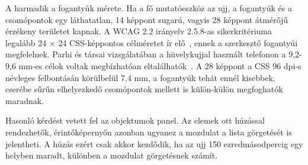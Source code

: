 A harmadik a fogantyúk mérete. Ha a fő mutatóeszköz az ujj, a fogantyúk és a csomópontok egy láthatatlan, 14 képpont sugarú, vagyis 28 képpont átmérőjű érzékeny területet kapnak. A WCAG 2.2 irányelv 2.5.8-as sikerkritériuma legalább 24 × 24 CSS-képpontos célméretet ír elő~\cite{wcag-target-size}, ennek a szerkesztő fogantyúi megfelelnek. Parhi és társai vizsgálatában a hüvelykujjal használt telefonon a 9,2-9,6 mm-es célok voltak megbízhatóan eltalálhatók~\cite{parhi2006}. A 28 képpont a CSS 96 dpi-s névleges felbontásán körülbelül 7,4 mm, a fogantyúk tehát ennél kisebbek, cserébe sűrűn elhelyezkedő csomópontok mellett is külön-külön megfoghatók maradnak.

Hasonló kérdést vetett fel az objektumok panel. Az elemek ott húzással rendezhetők, érintőképernyőn azonban ugyanez a mozdulat a lista görgetését is jelentheti. A húzás ezért csak akkor kezdődik, ha az ujj 150 ezredmásodpercig egy helyben maradt, különben a mozdulat görgetésnek számít.
